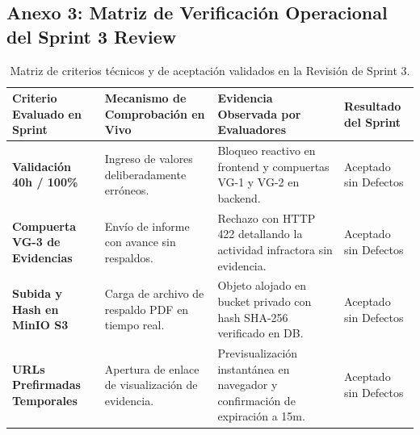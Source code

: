 \documentclass[12pt,a4paper]{article}
\begin{document}
\subsection*{Anexo 3: Matriz de Verificación Operacional del Sprint 3 Review}
\begin{table}[H]
\centering
\small
\renewcommand{\arraystretch}{1.15}
\begin{tabularx}{\textwidth}{|>{\hsize=0.75\hsize\raggedright\arraybackslash\bfseries\footnotesize}X|>{\hsize=1.25\hsize\raggedright\arraybackslash\footnotesize}X|>{\hsize=1.35\hsize\raggedright\arraybackslash\footnotesize}X|>{\hsize=0.65\hsize\centering\arraybackslash\footnotesize}X|}
\hline
\rowcolor{tableheader}
\textbf{Criterio Evaluado en Sprint} & \textbf{Mecanismo de Comprobación en Vivo} & \textbf{Evidencia Observada por Evaluadores} & \textbf{Resultado del Sprint} \\
\hline
Validación 40h / 100\% & Ingreso de valores deliberadamente erróneos. & Bloqueo reactivo en frontend y compuertas VG-1 y VG-2 en backend. & Aceptado sin Defectos \\
\hline
Compuerta VG-3 de Evidencias & Envío de informe con avance sin respaldos. & Rechazo con HTTP 422 detallando la actividad infractora sin evidencia. & Aceptado sin Defectos \\
\hline
Subida y Hash en MinIO S3 & Carga de archivo de respaldo PDF en tiempo real. & Objeto alojado en bucket privado con hash SHA-256 verificado en DB. & Aceptado sin Defectos \\
\hline
URLs Prefirmadas Temporales & Apertura de enlace de visualización de evidencia. & Previsualización instantánea en navegador y confirmación de expiración a 15m. & Aceptado sin Defectos \\
\hline
\end{tabularx}
\caption{Matriz de criterios técnicos y de aceptación validados en la Revisión de Sprint 3.}
\end{table}
\end{document}
